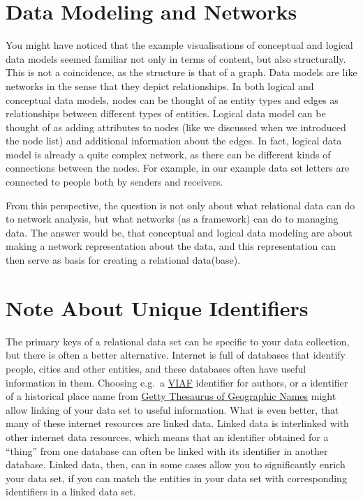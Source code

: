 \documentclass[
]{book}
\begin{document}
\hypertarget{data-modeling-and-networks}{%
\section{Data Modeling and Networks}\label{data-modeling-and-networks}}

You might have noticed that the example visualisations of conceptual and logical data models seemed familiar not only in terms of content, but also structurally. This is not a coincidence, as the structure is that of a graph. Data models are like networks in the sense that they depict relationships. In both logical and conceptual data models, nodes can be thought of as entity types and edges as relationships between different types of entities. Logical data model can be thought of as adding attributes to nodes (like we discussed when we introduced the node list) and additional information about the edges. In fact, logical data model is already a quite complex network,
as there can be different kinds of connections between the nodes. For example, in our example data set letters are connected to people
both by senders and receivers.

From this perspective, the question is not only about what relational data can do to network analysis,
but what networks (as a framework) can do to managing data. The answer would be, that conceptual and logical data modeling are about
making a network representation about the data, and this representation can then serve as basis for creating a relational data(base).

\hypertarget{note-about-unique-identifiers}{%
\section{Note About Unique Identifiers}\label{note-about-unique-identifiers}}

The primary keys of a relational data set can be specific to your data collection, but there is often a better alternative.
Internet is full of databases that identify people, cities and other entities, and these databases often have useful information
in them. Choosing e.g.~a \href{https://viaf.org/}{VIAF} identifier for authors, or a identifier of a historical place name from \href{https://www.getty.edu/research/tools/vocabularies/tgn/}{Getty Thesaurus of Geographic Names} might allow linking of your data set to useful information. What is even better, that many of these internet resources are linked data. Linked data is interlinked with other internet data resources, which means that an identifier obtained for a ``thing'' from one database can often be linked with its identifier in another database. Linked data, then, can in some cases allow you to significantly enrich your data set, if you can match the entities in your data set with corresponding identifiers in a linked data set.
\end{document}
